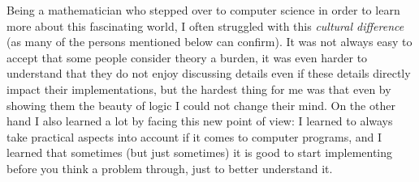 Being a mathematician who stepped over to computer science in order to learn more about this fascinating world, %
% 
%
I often struggled with this \emph{cultural difference} (as many of the persons mentioned below can confirm).
It was not always easy to accept that some people consider theory a burden, it was even harder to understand that they do not enjoy discussing details even if
these details directly impact their implementations, but the hardest thing for me was that even by showing them the beauty of logic I could not change their mind. %
On the other hand I also learned a lot by facing this new point of view: %
I learned to always take practical aspects into account if it comes to computer programs, and I learned that sometimes (but just sometimes)
it is good to start implementing before you think a problem through, just to better understand it.

